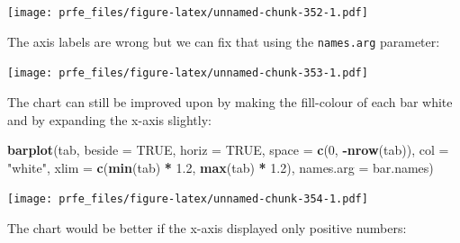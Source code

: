 \documentclass[12pt,]{book}
\newenvironment{Shaded}{\begin{snugshade}}{\end{snugshade}}
\newcommand{\KeywordTok}[1]{\textcolor[rgb]{0.13,0.29,0.53}{\textbf{#1}}}
\newcommand{\DataTypeTok}[1]{\textcolor[rgb]{0.13,0.29,0.53}{#1}}
\newcommand{\DecValTok}[1]{\textcolor[rgb]{0.00,0.00,0.81}{#1}}
\newcommand{\FloatTok}[1]{\textcolor[rgb]{0.00,0.00,0.81}{#1}}
\newcommand{\StringTok}[1]{\textcolor[rgb]{0.31,0.60,0.02}{#1}}
\newcommand{\OtherTok}[1]{\textcolor[rgb]{0.56,0.35,0.01}{#1}}
\newcommand{\OperatorTok}[1]{\textcolor[rgb]{0.81,0.36,0.00}{\textbf{#1}}}
\newcommand{\NormalTok}[1]{#1}
\theoremstyle{definition}
\theoremstyle{definition}
\theoremstyle{definition}
\theoremstyle{remark}
\begin{document}
\texttt{[image: prfe\_files/figure-latex/unnamed-chunk-352-1.pdf]}

The axis labels are wrong but we can fix that using the
\texttt{names.arg} parameter:

\begin{Shaded}
\end{Shaded}

\texttt{[image: prfe\_files/figure-latex/unnamed-chunk-353-1.pdf]}

The chart can still be improved upon by making the fill-colour of each
bar white and by expanding the x-axis slightly:

\begin{Shaded}
\begin{Highlighting}[]
\KeywordTok{barplot}\NormalTok{(tab, }\DataTypeTok{beside =} \OtherTok{TRUE}\NormalTok{, }\DataTypeTok{horiz =} \OtherTok{TRUE}\NormalTok{, }\DataTypeTok{space =} \KeywordTok{c}\NormalTok{(}\DecValTok{0}\NormalTok{, }\OperatorTok{-}\KeywordTok{nrow}\NormalTok{(tab)),}
        \DataTypeTok{col =} \StringTok{"white"}\NormalTok{, }\DataTypeTok{xlim =} \KeywordTok{c}\NormalTok{(}\KeywordTok{min}\NormalTok{(tab) }\OperatorTok{*}\StringTok{ }\FloatTok{1.2}\NormalTok{, }\KeywordTok{max}\NormalTok{(tab) }\OperatorTok{*}\StringTok{ }\FloatTok{1.2}\NormalTok{),}
        \DataTypeTok{names.arg =}\NormalTok{ bar.names)}
\end{Highlighting}
\end{Shaded}

\texttt{[image: prfe\_files/figure-latex/unnamed-chunk-354-1.pdf]}

The chart would be better if the x-axis displayed only positive numbers:
\end{document}
